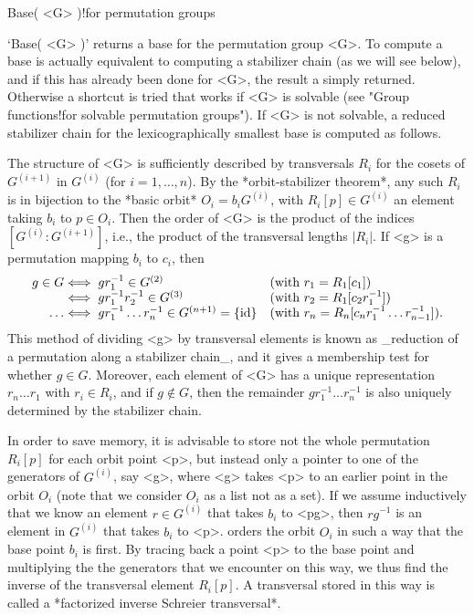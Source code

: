 \>Base( <G> )!{for permutation groups}

`Base( <G> )' returns a base for the permutation  group <G>. To compute a
base is  actually equivalent to computing a  stabilizer chain (as we will
see below), and if this   has already been   done for <G>, the result   a
simply  returned. Otherwise  a  shortcut is tried  that works   if <G> is
solvable (see "Group  functions!for solvable permutation groups"). If <G>
is  not  solvable, a  reduced stabilizer  chain for the lexicographically
smallest base is computed as follows.

\danger The structure  of  <G> is sufficiently described  by transversals
$R_i$ for the cosets of $G^{(i+1)}$ in $G^{(i)}$ (for $i=1,\ldots,n$). By
the  *orbit-stabilizer theorem*,  any such $R_i$  is  in bijection to the
*basic orbit*  $O_i =  b_iG^{(i)}$, with  $R_i[p]\in G^{(i)}$  an element
taking $b_i$ to $p\in O_i$. Then the order  of <G> is  the product of the
indices  $[G^{(i)}:G^{(i+1)}]$,  i.e.,  the product   of the  transversal
lengths $|R_i|$. If <g> is a permutation mapping $b_i$ to $c_i$, then
$$\centerline{\vbox{\halign{\hfil$#$& $\iff #$\hfil & \quad #\hfil \cr
  g\in G & gr_1^{-1}\in G^{(2)} & (with $r_1=R_1[c_1]$) \cr
         & gr_1^{-1}r_2^{-1}\in G^{(3)} &
                                  (with $r_2=R_1[c_2r_1^{-1}]$) \cr
  \ldots & gr_1^{-1}\ldots r_n^{-1}\in G^{(n+1)}=\{{\rm id}\} &
           (with $r_n=R_n[c_nr_1^{-1}\ldots r_{n-1}^{-1}]$).\cr}}}$$
This   method  of  dividing  <g> by  transversal  elements   is known  as
_reduction of a permutation   along a stabilizer  chain_, and it gives a membership test for
whether  $g\in G$.   Moreover,  each  element    of  <G> has   a   unique
representation  $r_n\ldots  r_1$ with  $r_i\in  R_i$, and if $g\notin G$,
then the remainder $gr_1^{-1}\ldots r_n^{-1}$ is also uniquely determined
by the stabilizer chain.

In  order  to save   memory,  it is  advisable   to store  not the  whole
permutation $R_i[p]$ for each orbit point <p>, but instead only a pointer
to one of the generators of $G^{(i)}$, say <g>, where <g> takes <p> to an
earlier point in  the orbit $O_i$ (note that  we consider $O_i$ as a list
not as  a set). If we assume  inductively that we know  an element $r \in
G^{(i)}$ that  takes $b_i$  to  <pg>,  then  $rg^{-1}$  is an element  in
$G^{(i)}$ that takes $b_i$ to <p>. {\GAP} orders the  orbit $O_i$ in such
a way that the base point $b_i$ is first. By  tracing back a point <p> to
the base  point and multiplying the  the generators  that we encounter on
this way, we thus find the inverse of the transversal element $R_i[p]$. A
transversal stored in this  way is called  a *factorized inverse Schreier
transversal*.

